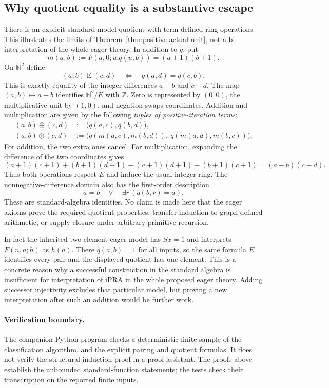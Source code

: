 \documentclass[11pt,letterpaper]{article}
\theoremstyle{definition}\newtheorem{definition}[theorem]{Definition}
\theoremstyle{remark}\newtheorem{remark}[theorem]{Remark}
\begin{document}
\subsection{Why quotient equality is a substantive escape}

There is an explicit standard-model quotient with term-defined ring
operations. This illustrates the limits of
Theorem~\ref{thm:positive-actual-unit}, not a bi-interpretation of the
whole eager theory.
In addition to $q$, put
\[
                  m(a,b):=F(a,0;u.q(u,b))=(a+1)(b+1).
\]
On $\mathbb N^2$ define
\[
 (a,b)\mathrel E(c,d)
       \quad\Longleftrightarrow\quad q(a,d)=q(c,b).
\]
This is exactly equality of the integer differences $a-b$ and $c-d$.
The map $(a,b)\mapsto a-b$ identifies $\mathbb N^2/E$ with
$\mathbb Z$. Zero is represented by $(0,0)$, the multiplicative unit
by $(1,0)$, and negation swaps coordinates. Addition and multiplication
are given by the following
\emph{tuples of positive-iteration terms}:
\[
\begin{aligned}
 (a,b)\mathbin\oplus(c,d)
     &:=\bigl(q(a,c),q(b,d)\bigr),\\
 (a,b)\mathbin\otimes(c,d)
     &:=\bigl(q(m(a,c),m(b,d)),\ q(m(a,d),m(b,c))\bigr).
\end{aligned}
\]
For addition, the two extra ones cancel. For multiplication, expanding
the difference of the two coordinates gives
\[
 (a+1)(c+1)+(b+1)(d+1)
 -(a+1)(d+1)-(b+1)(c+1)
 =(a-b)(c-d).
\]
Thus both operations respect $E$ and induce the usual integer ring.
The nonnegative-difference domain also has the first-order description
\[
                 a=b\quad\lor\quad\exists r\,(q(b,r)=a).
\]
These are standard-algebra identities. No claim is made here that the
eager axioms prove the required quotient properties, transfer induction
to graph-defined arithmetic, or supply closure under arbitrary primitive
recursion.

In fact the inherited two-element eager model has $Sx=1$ and interprets
$F(n,a;h)$ as $h(a)$. There $q(a,b)=1$ for all inputs, so the same
formula $E$ identifies every pair and the displayed quotient has one
element. This is a concrete reason why a successful construction in
the standard algebra is insufficient for interpretation of iPRA in the
whole proposed eager theory. Adding successor injectivity excludes that
particular model, but proving a new interpretation after such an addition
would be further work.

\paragraph{Verification boundary.}
The companion Python program checks a deterministic finite sample of the
classification algorithm, and the explicit pairing and quotient formulas.
It does not verify the structural induction proof in a proof assistant.
The proofs above establish the unbounded standard-function statements;
the tests check their transcription on the reported finite inputs.
\end{document}

